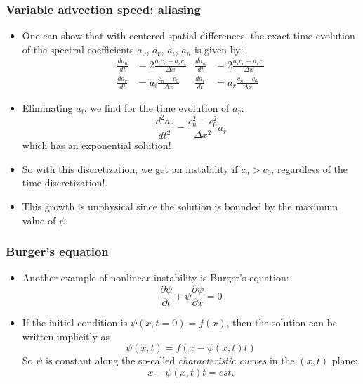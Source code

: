 \documentclass[aspectratio=149,9pt]{beamer}
\begin{document}
%
%
\begin{frame}
	\frametitle{Variable advection speed: aliasing}
	\begin{itemize}
		\item One can show that with centered spatial differences, the exact time evolution of the spectral coefficients $a_0$, $a_r$, $a_i$, $a_n$ is given by:
			\begin{align*}
				\frac{d a_0}{dt} &= 2 \frac{a_i c_r - a_r c_i}{\Delta x}	&
				\frac{d a_n}{dt} &= 2 \frac{a_i c_r + a_r c_i}{\Delta x}	\\
				\frac{d a_r}{dt} &= a_i \frac{c_n + c_0}{\Delta x}	&
				\frac{d a_i}{dt} &= a_r \frac{c_n - c_0}{\Delta x}
			\end{align*}
		\item Eliminating $a_i$, we find for the time evolution of $a_r$:
			\begin{equation*}
				\frac{d^2 a_r}{dt^2} = \frac{c_n^2 - c_0^2}{\Delta x^2} a_r
			\end{equation*}
			which has an exponential solution!
		\item So with this discretization, we get an instability if $c_n > c_0$, regardless of the time discretization!.
		\item This growth is unphysical since the solution is bounded by the maximum value of $\psi$.
	\end{itemize}
\end{frame}
%
%
\begin{frame}
	\frametitle{Burger's equation}
	\begin{itemize}
		\item Another example of nonlinear instability is Burger's equation:
			\begin{equation*}
			 \frac{\partial \psi}{\partial t} + \psi \frac{\partial \psi}{\partial x} = 0
			\end{equation*}
		\item If the initial condition is $\psi(x,t=0)=f(x)$, then the solution can be written implicitly as
			\begin{equation*}
				\psi(x,t) = f ( x - \psi(x,t) t)
			\end{equation*}
			So $\psi$ is constant along the so-called \emph{characteristic curves} in the $(x,t)$ plane:
			\begin{equation*}
				x - \psi(x,t) t = cst.
			\end{equation*}
	\end{itemize}
\end{frame}
\end{document}
